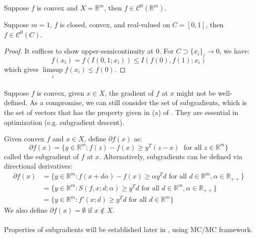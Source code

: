 \begin{coro}
	\label{coro:022-continuity-real-valued}
	Suppose $f$ is convex and $X=\mathbb{R}^m$, then $f\in \mathscr{C}^0(\mathbb{R}^m)$.
\end{coro}

\begin{coro}
	\label{coro:022-line-continuity}
	Suppose $m=1$, $f$ is closed, convex, and real-valued on $C=[0,1]$, then $f\in \mathscr{C}^0(C)$.
\end{coro}

\begin{proof}
	It suffices to show upper-semicontinuity at $0$. For $C\supset \{x_i\}_i\to 0$, we have:
	\[
		f(x_i)=f(I(0,1;x_i))\leq I(f(0),f(1); x_i)
	\]
	which gives $\underset{i}{\operatorname{limsup}}f(x_i)\leq f(0)$.
\end{proof}

\paragraph{}Suppose $f$ is convex, given $x\in X$, the gradient of $f$ at $x$ might not be well-defined. As a compromise, we can still consider the set of subgradients, which is the set of vectors that has the property given in (a) of . They are essential in optimization (e.g. subgradient descent).

\begin{defn}[Subgradients]\label{defn:022-subgradients}
	Given convex $f$ and $x\in X$, define $\partial f(x)$ as:
	\[
		\partial f(x) = \{
		y\in \mathbb{R}^m: f(z) - f(x) \geq y^T(z- x)\;\text{ for all }z\in \mathbb{R}^m
		\}
	\]
	called the subgradient of $f$ at $x$. Alternatively, subgradients can be defined via directional derivatives:
	\begin{align*}
		\partial f(x) & = \{y\in \mathbb{R}^m: f(x+d \alpha )-f(x) \geq \alpha y^Td \text{ for all }d \in \mathbb{R}^m, \alpha\in \mathbb{R}_{++} \} \\
		              & = \{y\in \mathbb{R}^m: S(f,x; d; \alpha) \geq y^Td \text{ for all }d \in \mathbb{R}^m, \alpha\in \mathbb{R}_{++} \}          \\
		              & = \{y\in \mathbb{R}^m: f'(x; d) \geq y^T d \text{ for all }d \in \mathbb{R}^m \}
	\end{align*}
	We also define $\partial f(x)=\emptyset$ if $x\notin X$.
\end{defn}

\paragraph{}Properties of subgradients will be established later in , using MC/MC framework.

